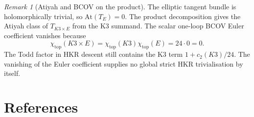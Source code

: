 \documentclass[11pt]{amsart}
\theoremstyle{definition}
\theoremstyle{remark}
\newtheorem{remark}[theorem]{Remark}
\providecommand{\At}{\mathrm{At}}
\begin{document}
\begin{remark}[Atiyah and BCOV on the product]
\label{rem:k3e-atiyah-bcov}
The elliptic tangent bundle is holomorphically trivial, so
$\At(T_E)=0$. The product decomposition gives the Atiyah class of
$T_{K3\times E}$ from the K3 summand. The scalar one-loop BCOV Euler
coefficient vanishes because
\[
  \chi_{\mathrm{top}}(K3\times E)=\chi_{\mathrm{top}}(K3)\chi_{\mathrm{top}}(E)
  =24\cdot0=0.
\]
The Todd factor in HKR descent still contains the K3 term
$1+c_2(K3)/24$. The vanishing of the Euler coefficient supplies no
global strict HKR trivialisation by itself.
\end{remark}

\section{References}
\label{sec:references}
\end{document}

